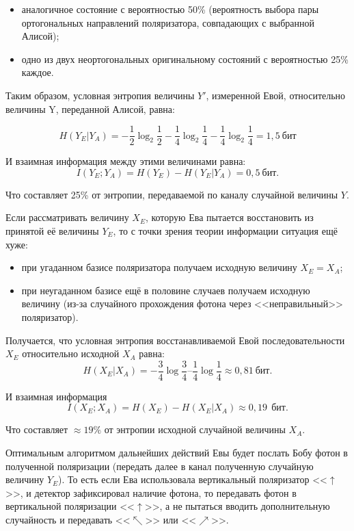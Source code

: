 \begin{itemize}
	\item аналогичное состояние с вероятностью 50\% (вероятность выбора пары ортогональных направлений поляризатора, совпадающих с выбранной Алисой);
	\item одно из двух неортогональных оригинальному состояний с вероятностью 25\% каждое.
\end{itemize}

Таким образом, условная энтропия величины $Y'$, измеренной Евой, относительно величины Y, переданной Алисой, равна:

\[ H \left( Y_E | Y_A \right) = - \frac{1}{2} \log_2 \frac{1}{2} - \frac{1}{4} \log_2 \frac{1}{4} - \frac{1}{4} \log_2 \frac{1}{4} = 1,5~\text{бит} \]

И взаимная информация между этими величинами равна:
\[ I \left( Y_E ; Y_A \right) = H \left( Y_E \right) - H ( Y_E | Y_A ) = 0,5~\text{бит}.\]

Что составляет 25\% от энтропии, передаваемой по каналу случайной величины $Y$.

Если рассматривать величину $X_E$, которую Ева пытается восстановить из принятой её величины $Y_E$, то с точки зрения теории информации ситуация ещё хуже:

\begin{itemize}
	\item при угаданном базисе поляризатора получаем исходную величину $X_E = X_A$;
	\item при неугаданном базисе ещё в половине случаев получаем исходную величину (из-за случайного прохождения фотона через <<неправильный>> поляризатор).
\end{itemize}

Получается, что условная энтропия восстанавливаемой Евой последовательности $X_E$ относительно исходной $X_A$ равна:
\[ H \left( X_E | X_A \right) = - \frac{3}{4} \log \frac{3}{4} – \frac{1}{4} \log \frac{1}{4} \approx 0,81~\text{бит.}\]

И взаимная информация
\[ I \left( X_E; X_A \right) = H \left( X_E \right) - H \left( X_E | X_A \right) \approx 0,19~~\text{бит}. \]

Что составляет $\approx 19\%$ от энтропии исходной случайной величины $X_A$.

Оптимальным алгоритмом дальнейших действий Евы будет послать Бобу фотон в полученной поляризации (передать далее в канал полученную случайную величину $Y_E$). То есть если Ева использовала вертикальный поляризатор <<$\uparrow$>>, и детектор зафиксировал наличие фотона, то передавать фотон в вертикальной поляризации <<$\uparrow$>>, а не пытаться вводить дополнительную случайность и передавать <<$\nwarrow$>> или <<$\nearrow$>>.

